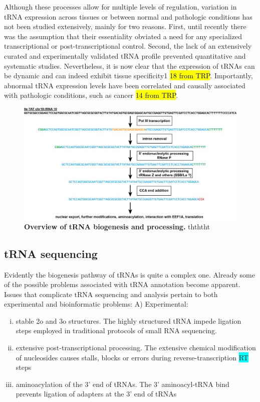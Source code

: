\documentclass[12pt]{rockefeller}
\newcommand{\cyan}[1]{\colorbox{cyan}{#1}}
\begin{document}
Although these processes allow for multiple levels of regulation, variation in tRNA expression across tissues or between normal and pathologic conditions has not been studied extensively, mainly for two reasons. First, until recently there was the assumption that their essentiality obviated a need for any specialized transcriptional or post-transcriptional control. Second, the lack of an extensively curated and experimentally validated tRNA profile prevented quantitative and systematic studies. Nevertheless, it is now clear that the expression of tRNAs can be dynamic and can indeed exhibit tissue specificity1 \hl{18 from TRP}. Importantly, abnormal tRNA expression levels have been correlated and causally associated with pathologic conditions, such as cancer \hl{14 from TRP}.
\newline
\begin{figure}[!ht]%
\centering
\includegraphics[width=\textwidth]{biogenesis.png}%
\caption[tRNA biogensis]{\textbf{Overview of tRNA biogenesis and processing.} thththt}
\label{biogenesis}%
\end{figure}

\subsection{tRNA sequencing}
Evidently the biogenesis pathway of tRNAs is quite a complex one. 
Already some of the possible problems associated with tRNA annotation become apparent. 
Issues that complicate tRNA sequencing and analysis pertain to both experimental and bioinformatic problems:
A) Experimental:%
\vspace{-2.5mm}
\begin{enumerate}[i)]
\itemsep-0.5em 
\item stable 2o and 3o structures. The highly structured tRNA impede ligation steps employed in traditional protocols of small RNA sequencing.
\item extensive post-transcriptional processing. The extensive chemical modification of nucleosides causes stalls, blocks or errors during reverse-transcription \cyan{RT} steps
\item aminoacylation of the 3' end of tRNAs. The 3' aminoacyl-tRNA bind prevents ligation of adapters at the 3' end of tRNAs
\end{enumerate}
\end{document}
